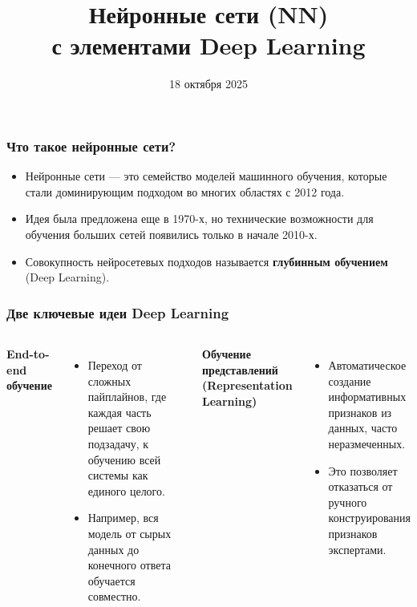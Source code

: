 \documentclass[notheorems, handout]{beamer}
\title[Нейронные сети и Deep Learning]{Нейронные сети (NN) \\ с элементами Deep Learning}
\institute[Санкт-Петербургский Государственный Университет]{%
  \small
  Санкт-Петербургский государственный университет\\
  Кафедра статистического моделирования
}
\date{18 октября 2025}
\begin{document}
\begin{frame}
    \titlepage
\end{frame}
\begin{frame}
    \frametitle{Что такое нейронные сети?}
    \begin{itemize}
        \item Нейронные сети --- это семейство моделей машинного обучения, которые стали доминирующим подходом во многих областях с 2012 года.
        \item Идея была предложена еще в 1970-х, но технические возможности для обучения больших сетей появились только в начале 2010-х.
        \item Совокупность нейросетевых подходов называется \textbf{глубинным обучением} (Deep Learning).
    \end{itemize}
\end{frame}

\begin{frame}
    \frametitle{Две ключевые идеи Deep Learning}
    \begin{columns}[c]
        \textbf{End-to-end обучение}
        \begin{itemize}
            \item<2-> Переход от сложных пайплайнов, где каждая часть решает свою подзадачу, к обучению всей системы как единого целого.
            \item<3-> Например, вся модель от сырых данных до конечного ответа обучается совместно.
        \end{itemize}

        \textbf{Обучение представлений (Representation Learning)}
        \begin{itemize}
            \item<2-> Автоматическое создание информативных признаков из данных, часто неразмеченных.
            \item<3-> Это позволяет отказаться от ручного конструирования признаков экспертами.
        \end{itemize}
    \end{columns}
\end{frame}
\end{document}
